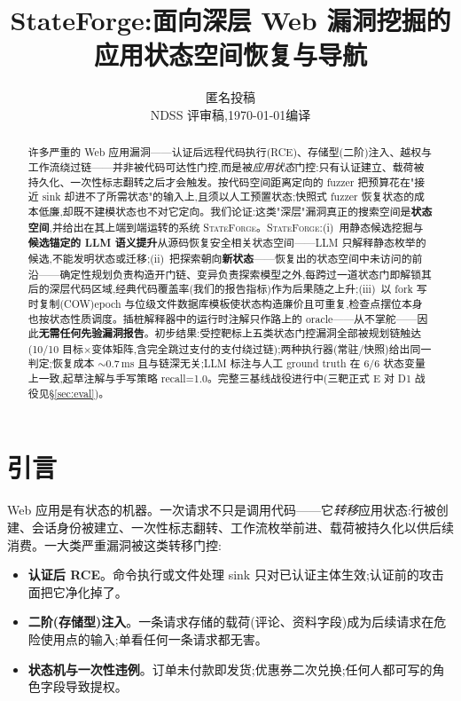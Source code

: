\documentclass[letterpaper,twocolumn,10pt]{article}
\newcommand{\sys}{\textsc{StateForge}}
\begin{document}
\date{}
\title{\Large \bf StateForge:面向深层 Web 漏洞挖掘的应用状态空间恢复与导航}
\author{{\normalsize 匿名投稿}\\[-2mm]
{\normalsize NDSS 评审稿,\today 编译}}
\maketitle

\begin{abstract}
许多严重的 Web 应用漏洞——认证后远程代码执行(RCE)、存储型(二阶)注入、越权与工作流绕过链——并非被代码可达性门控,而是被\emph{应用状态}门控:只有认证建立、载荷被持久化、一次性标志翻转之后才会触发。按代码空间距离定向的 fuzzer 把预算花在"接近 sink 却进不了所需状态"的输入上,且须以人工预置状态;快照式 fuzzer 恢复状态的成本低廉,却既不建模状态也不对它定向。我们论证:这类"深层"漏洞真正的搜索空间是\textbf{状态空间},并给出在其上端到端运转的系统 \sys{}。\sys{}:(i)~用静态候选挖掘与\textbf{候选锚定的 LLM 语义提升}从源码恢复安全相关状态空间——LLM 只解释静态枚举的候选,不能发明状态或迁移;(ii)~把探索朝向\textbf{新状态}——恢复出的状态空间中未访问的前沿——确定性规划负责构造开门链、变异负责探索模型之外,每跨过一道状态门即解锁其后的深层代码区域,经典代码覆盖率(我们的报告指标)作为后果随之上升;(iii)~以 fork 写时复制(COW)epoch 与位级文件数据库模板使状态构造廉价且可重复,检查点摆位本身也按状态性质调度。插桩解释器中的运行时注解只作路上的 oracle——从不掌舵——因此\textbf{无需任何先验漏洞报告}。初步结果:受控靶标上五类状态门控漏洞全部被规划链触达(10/10 目标×变体矩阵,含完全跳过支付的支付绕过链);两种执行器(常驻/快照)给出同一判定;恢复成本 ${\sim}0.7$\,ms 且与链深无关;LLM 标注与人工 ground truth 在 6/6 状态变量上一致,起草注解与手写策略 recall=1.0。完整三基线战役进行中(三靶正式 E 对 D1 战役见\S\ref{sec:eval})。%
\end{abstract}

\section{引言}
\label{sec:intro}

Web 应用是有状态的机器。一次请求不只是调用代码——它\emph{转移}应用状态:行被创建、会话身份被建立、一次性标志翻转、工作流枚举前进、载荷被持久化以供后续消费。一大类严重漏洞被这类转移门控:

\begin{itemize}
\item \textbf{认证后 RCE}。命令执行或文件处理 sink 只对已认证主体生效;认证前的攻击面把它净化掉了。
\item \textbf{二阶(存储型)注入}。一条请求存储的载荷(评论、资料字段)成为后续请求在危险使用点的输入;单看任何一条请求都无害。
\item \textbf{状态机与一次性违例}。订单未付款即发货;优惠券二次兑换;任何人都可写的角色字段导致提权。
\end{itemize}
\end{document}
